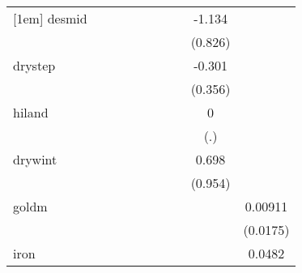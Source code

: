 {\begin{tabular}{l*{9}{c}}
[1em]
desmid      &                     &                     &                     &                     &                     &                     &                     &      -1.134         &                     \\
            &                     &                     &                     &                     &                     &                     &                     &     (0.826)         &                     \\
[1em]
drystep     &                     &                     &                     &                     &                     &                     &                     &      -0.301         &                     \\
            &                     &                     &                     &                     &                     &                     &                     &     (0.356)         &                     \\
[1em]
hiland      &                     &                     &                     &                     &                     &                     &                     &           0         &                     \\
            &                     &                     &                     &                     &                     &                     &                     &         (.)         &                     \\
[1em]
drywint     &                     &                     &                     &                     &                     &                     &                     &       0.698         &                     \\
            &                     &                     &                     &                     &                     &                     &                     &     (0.954)         &                     \\
[1em]
goldm       &                     &                     &                     &                     &                     &                     &                     &                     &     0.00911         \\
            &                     &                     &                     &                     &                     &                     &                     &                     &    (0.0175)         \\
[1em]
iron        &                     &                     &                     &                     &                     &                     &                     &                     &      0.0482         \\

\end{tabular}}
